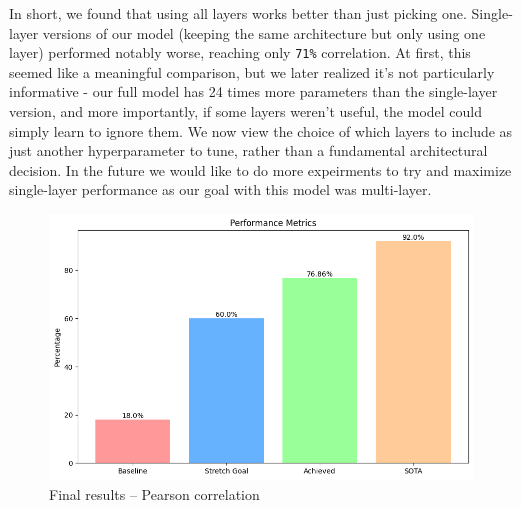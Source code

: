 \documentclass{article}
\begin{document}
In short, we found that using all layers works better than just picking one. Single-layer versions of our model (keeping the same architecture but only using one layer) performed notably worse, reaching only \verb|71%| correlation. At first, this seemed like a meaningful comparison, but we later realized it's not particularly informative - our full model has 24 times more parameters than the single-layer version, and more importantly, if some layers weren't useful, the model could simply learn to ignore them. We now view the choice of which layers to include as just another hyperparameter to tune, rather than a fundamental architectural decision. In the future we would like to do more expeirments to try and maximize single-layer performance as our goal with this model was multi-layer.

\begin{figure}
    \centering
    \includegraphics[width=.85\linewidth]{final_results.png}
    \caption{Final results -- Pearson correlation}
    \label{fig:final-reslts}
\end{figure}
\end{document}
